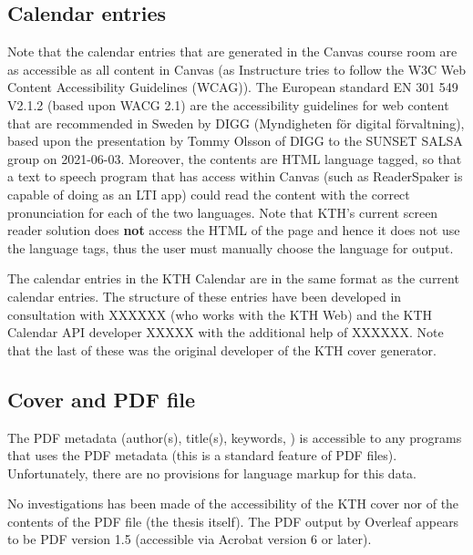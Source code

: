 \subsection{Calendar entries}
\label{sec:accessibilityOfCalendarEntries}
Note that the calendar entries that are generated in the Canvas course room are as accessible as all content in Canvas (as Instructure tries to follow the W3C Web Content Accessibility Guidelines (WCAG)). The European standard EN 301 549 V2.1.2 (based upon WACG 2.1) are the accessibility guidelines for web content that are recommended in Sweden by DIGG (Myndigheten för digital förvaltning), based upon the presentation by Tommy Olsson of DIGG to the SUNSET SALSA group on 2021-06-03. Moreover, the contents are HTML language tagged, so that a text to speech program that has access within Canvas (such as ReaderSpaker is capable of doing as an LTI app) could read the content with the correct pronunciation for each of the two languages. Note that KTH’s current screen reader solution does \textbf{not} access the HTML of the page and hence it does not use the language tags, thus the user must manually choose the language for output.

The calendar entries in the KTH Calendar are in the same format as the current calendar entries. The structure of these entries have been developed in consultation with XXXXXX (who works with the KTH Web) and the KTH Calendar API developer XXXXX with the additional help of XXXXXX. Note that the last of these was the original developer of the KTH cover generator.

\subsection{Cover and PDF file}
\label{sec:ccessibilityOfCoverandPDF}
The PDF metadata (author(s), title(s), keywords, \etc) is accessible to any programs that uses the PDF metadata (this is a standard feature of PDF files). Unfortunately, there are no provisions for language markup for this data.

No investigations has been made of the accessibility of the KTH cover nor of the contents of the PDF file (\ie the thesis itself). The PDF output by Overleaf appears to be PDF version 1.5 (\ie accessible via Acrobat version 6 or later).

